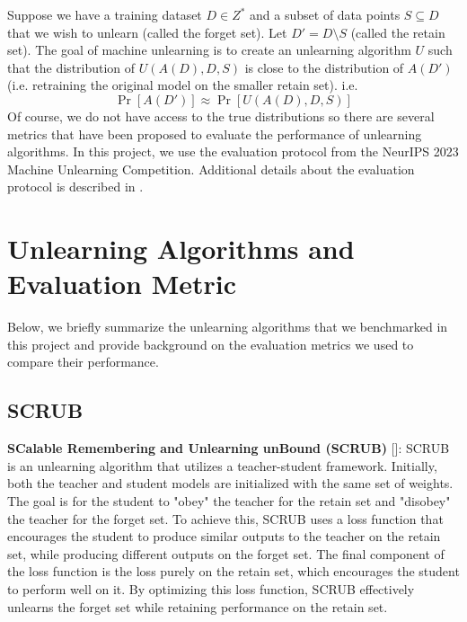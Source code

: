 \documentclass{article}
\begin{document}
Suppose we have a training dataset $D \in Z^*$ and a subset of data points $S \subseteq D$ that we wish to unlearn (called the forget set). Let $D' = D \setminus S$ (called the retain set). The goal of machine unlearning is to create an unlearning algorithm $U$ such that the distribution of $U(A(D), D, S)$ is close to the distribution of $A(D')$ (i.e. retraining the original model on the smaller retain set).
i.e.
\begin{equation}
    \Pr[A(D')] \approx \Pr[U(A(D), D, S)]
\end{equation} 
Of course, we do not have access to the true distributions so there are several metrics that have been proposed to evaluate the performance of unlearning algorithms. In this project, we use the evaluation protocol from the NeurIPS 2023 Machine Unlearning Competition. Additional details about the evaluation protocol is described in .

\section{Unlearning Algorithms and Evaluation Metric}
Below, we briefly summarize the unlearning algorithms that we benchmarked in this project and provide background on the evaluation metrics we used to compare their performance.

\subsection{SCRUB}
\textbf{SCalable Remembering and Unlearning unBound (SCRUB)} [\cite{kurmanji2023unboundedmachineunlearning}]: SCRUB is an unlearning algorithm that utilizes a teacher-student framework. Initially, both the teacher and student models are initialized with the same set of weights. The goal is for the student to "obey" the teacher for the retain set and "disobey" the teacher for the forget set. 
To achieve this, SCRUB uses a loss function that encourages the student to produce similar outputs to the teacher on the retain set, while producing different outputs on the forget set. The final component of the loss function is the loss purely on the retain set, which encourages the student to perform well on it. By optimizing this loss function, SCRUB effectively unlearns the forget set while retaining performance on the retain set.
\end{document}
